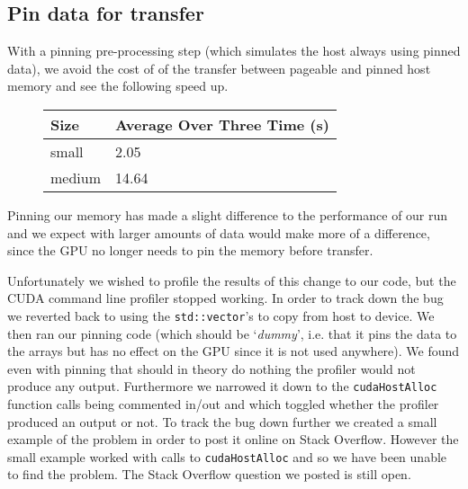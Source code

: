 \subsection{Pin data for transfer}
With a pinning pre-processing step (which simulates the host always using pinned data), we avoid the cost of of the transfer between pageable and pinned host memory and see the following speed up.
\begin{figure}[H]\centering \begin{tabular}{ l | l }
  \hline
  Size & Average Over Three Time (s) \\
  \hline
  \hline
  small & 2.05 \\
  medium & 14.64 \\
  \hline
\end{tabular} \end{figure}

Pinning our memory has made a slight difference to the performance of our run and we expect with larger amounts of data would make more of a difference, since the GPU no longer needs to pin the memory before transfer.

Unfortunately we wished to profile the results of this change to our code, but the CUDA command line profiler stopped working. In order to track down the bug we reverted back to using the \verb!std::vector!'s to copy from host to device. We then ran our pinning code (which should be `\emph{dummy}', i.e. that it pins the data to the arrays but has no effect on the GPU since it is not used anywhere). We found even with pinning that should in theory do nothing the profiler would not produce any output. Furthermore we narrowed it down to the \verb!cudaHostAlloc! function calls being commented in/out and which toggled whether the profiler produced an output or not.
To track the bug down further we created a small example of the problem in order to post it online on Stack Overflow. However the small example worked with calls to \verb!cudaHostAlloc! and so we have been unable to find the problem. The Stack Overflow question we posted is still open.~\cite{so_profiler}